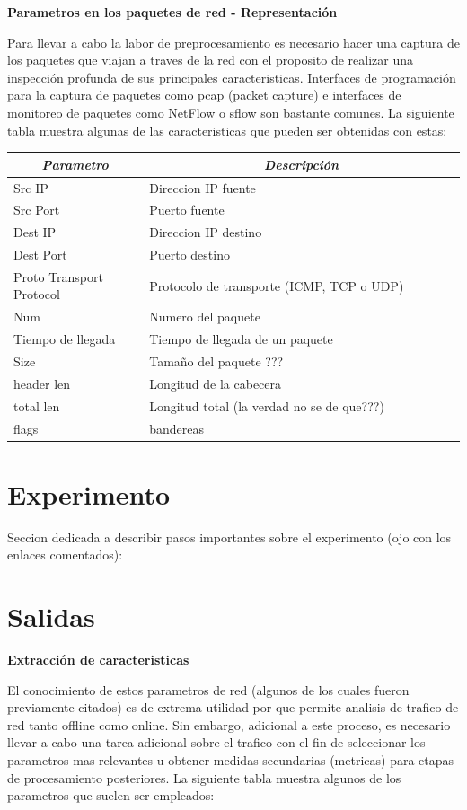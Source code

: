 \documentclass[12pt]{article}
\begin{document}
\textbf{Parametros en los paquetes de red - Representación}


Para llevar a cabo la labor de preprocesamiento es necesario hacer una captura de los paquetes que viajan a traves de la red con el proposito de realizar una inspección profunda de sus principales caracteristicas. Interfaces de programación para la captura de paquetes como pcap (packet capture) e interfaces de monitoreo de paquetes como NetFlow o sflow son bastante comunes. La siguiente tabla muestra algunas de las caracteristicas que pueden ser obtenidas con estas:

\begin{table}[htbp]
\centering
\begin{tabular}{|p{0.3\linewidth}|p{0.7\linewidth}|}
\hline
\multicolumn{1}{|c|}{\textit{\textbf{Parametro}}} & \multicolumn{1}{c|}{\textit{\textbf{Descripción}}} \tabularnewline \hline
Src IP & Direccion IP fuente \tabularnewline \hline
Src Port &  Puerto fuente \tabularnewline \hline  
Dest IP & Direccion IP destino \tabularnewline \hline
Dest Port & Puerto destino \tabularnewline \hline
Proto Transport Protocol & Protocolo de transporte  (ICMP, TCP o UDP)  \tabularnewline \hline
Num & Numero del paquete \tabularnewline \hline
Tiempo de llegada & Tiempo de llegada de un paquete \tabularnewline \hline
Size & Tamaño del paquete ??? \tabularnewline \hline
header len & Longitud de la cabecera \tabularnewline \hline
total len & Longitud total (la verdad no se de que???) \tabularnewline \hline
flags & bandereas \tabularnewline \hline
\end{tabular}
\end{table}

\section{Experimento}

Seccion dedicada a describir pasos importantes sobre el experimento (ojo con los enlaces comentados):


\section{Salidas}

\textbf{Extracción de caracteristicas}

El conocimiento de estos parametros de red (algunos de los cuales fueron previamente citados) es de extrema utilidad por que permite analisis de trafico de red tanto offline como online. Sin embargo, adicional a este proceso, es necesario llevar a cabo una tarea adicional sobre el trafico con el fin de seleccionar los parametros mas relevantes u obtener medidas secundarias (metricas) para etapas de procesamiento posteriores. La siguiente tabla muestra algunos de los parametros que suelen ser empleados:
\end{document}
